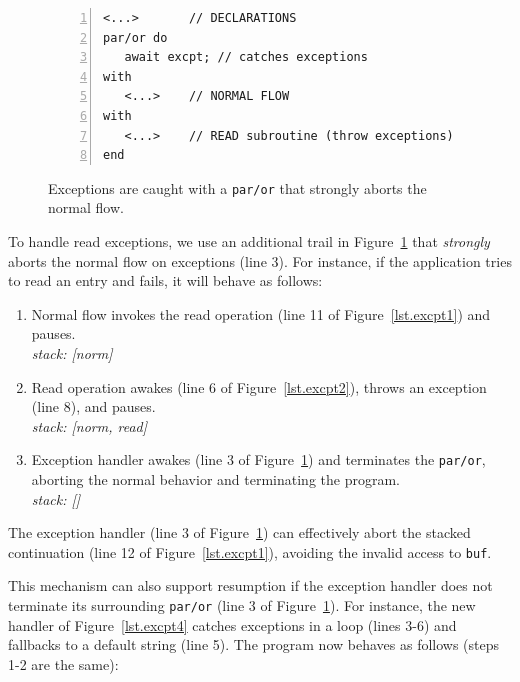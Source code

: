 \documentclass{acm_proc_article-sp}
\newcommand{\code}[1] {{\small{\texttt{#1}}}}
\newcommand{\1}{\;}
\newcommand{\2}{\;\;}
\newcommand{\3}{\;\;\;}
\newcommand{\5}{\;\;\;\;\;}
\begin{document}
\begin{figure}[t]
\begin{lstlisting}[numbers=left,xleftmargin=2em]
<...>       // DECLARATIONS
par/or do
   await excpt; // catches exceptions
with
   <...>    // NORMAL FLOW
with
   <...>    // READ subroutine (throw exceptions)
end
\end{lstlisting}
\caption{ Exceptions are caught with a \code{par/or} that strongly aborts the 
normal flow.
\label{lst.excpt3}
}
\end{figure}

To handle read exceptions, we use an additional trail in 
Figure~\ref{lst.excpt3} that \emph{strongly} aborts the normal flow on 
exceptions (line 3).
For instance, if the application tries to read an entry and fails, it will 
behave as follows:

{\small
\begin{enumerate}
\setlength{\itemsep}{0pt}
\item Normal flow invokes the read operation (line 11 of 
    Figure~\ref{lst.excpt1}) and pauses.\\
    \emph{stack: [norm]}
\item Read operation awakes (line 6 of Figure~\ref{lst.excpt2}), throws an 
    exception (line 8), and pauses.\\
    \emph{stack: [norm, read]}
\item Exception handler awakes (line 3 of Figure~\ref{lst.excpt3}) and 
terminates the \code{par/or}, aborting the normal behavior and terminating the 
program. \\
    \emph{stack: []}
\end{enumerate}
}

The exception handler (line 3 of Figure~\ref{lst.excpt3}) can effectively abort 
the stacked continuation (line 12 of Figure~\ref{lst.excpt1}), avoiding the 
invalid access to \code{buf}.
%

This mechanism can also support resumption if the exception handler does not 
terminate its surrounding \code{par/or} (line 3 of Figure~\ref{lst.excpt3}).
For instance, the new handler of Figure~\ref{lst.excpt4} catches exceptions in 
a loop (lines 3-6) and fallbacks to a default string (line 5).
The program now behaves as follows (steps 1-2 are the same):
\end{document}
